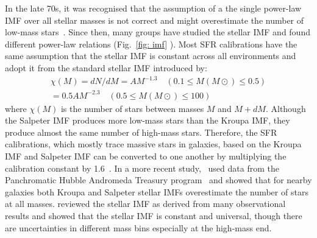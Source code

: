 In the late 70s, it was recognised that the assumption of a the single power-law IMF over all stellar masses is not correct and might overestimate the number of low-mass stars~\citep{Kroupa93, Bastin10}. 
Since then, many groups have studied the stellar IMF and found different power-law relations (Fig.~\ref{fig: imf} ). 
Most SFR calibrations have the same assumption that the stellar IMF is constant across all environments and adopt it from the standard stellar IMF introduced by\cite{Kroupa01}:
\begin{align}
\chi (M) = dN/dM = A M^{-1.3}    \quad    (0.1 \le M(M{\odot}) \le 0.5)\\                  
           = 0.5 A M^{-2.3}    \quad    (0.5 \le M(M{\odot}) \le 100)
\end{align}
where $\chi(M)$ is the number of stars between masses $M$ and $M+dM$. %
Although the Salpeter IMF produces more low-mass stars than the Kroupa IMF, they produce almost the same number of high-mass stars. 
Therefore, the SFR calibrations, which mostly trace massive stars in galaxies, based on the Kroupa IMF and Salpeter IMF can be converted to one another by multiplying the calibration constant by 1.6~\citep{Calzetti13}. %
In a more recent study,~\cite{Weisz15} used data from the Panchromatic Hubble Andromeda Treasury program~\citep[PHAT][]{Dalcanton12} and showed that for nearby galaxies both Kroupa and Salpeter stellar IMFs overestimate the number of stars at all masses.%
\cite{Bastin10} reviewed the stellar IMF as derived from many observational results and showed that the stellar IMF is constant and universal, though there are uncertainties in different mass bins especially at the high-mass end. %


